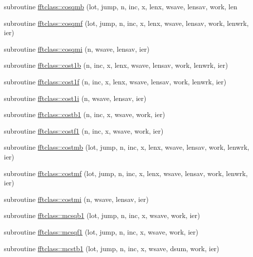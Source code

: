 \begin{DoxyCompactItemize}
subroutine \mbox{\hyperlink{namespacefftclass_a766146700483880896edee5e866f29a6}{fftclass\+::cosqmb}} (lot, jump, n, inc, x, lenx, wsave, lensav, work, len
\item 
subroutine \mbox{\hyperlink{namespacefftclass_a48467d0cccf9f7f93786f4997fe714f5}{fftclass\+::cosqmf}} (lot, jump, n, inc, x, lenx, wsave, lensav, work, lenwrk, ier)
\item 
subroutine \mbox{\hyperlink{namespacefftclass_a9851ac46e48072ac6c85e3c574a10dc5}{fftclass\+::cosqmi}} (n, wsave, lensav, ier)
\item 
subroutine \mbox{\hyperlink{namespacefftclass_a2bdaaab2b5d3130f8339f9463daa6db9}{fftclass\+::cost1b}} (n, inc, x, lenx, wsave, lensav, work, lenwrk, ier)
\item 
subroutine \mbox{\hyperlink{namespacefftclass_ae01eaac3c675ef6c95b60a480bda63ba}{fftclass\+::cost1f}} (n, inc, x, lenx, wsave, lensav, work, lenwrk, ier)
\item 
subroutine \mbox{\hyperlink{namespacefftclass_aa0605a45256c5ff2bfcd9229dd8854e4}{fftclass\+::cost1i}} (n, wsave, lensav, ier)
\item 
subroutine \mbox{\hyperlink{namespacefftclass_a2769de58926e8dc80c0fa9f862de7dce}{fftclass\+::costb1}} (n, inc, x, wsave, work, ier)
\item 
subroutine \mbox{\hyperlink{namespacefftclass_af419be9c656e387f89facc1033cf4f55}{fftclass\+::costf1}} (n, inc, x, wsave, work, ier)
\item 
subroutine \mbox{\hyperlink{namespacefftclass_a1bb83e3c96bf08b2789acf52feef22b8}{fftclass\+::costmb}} (lot, jump, n, inc, x, lenx, wsave, lensav, work, lenwrk, ier)
\item 
subroutine \mbox{\hyperlink{namespacefftclass_a04e4666f4382e42cf8e63ee5c44fc61a}{fftclass\+::costmf}} (lot, jump, n, inc, x, lenx, wsave, lensav, work, lenwrk, ier)
\item 
subroutine \mbox{\hyperlink{namespacefftclass_a4e2ea9d14ac7ed425be8cb1fd1ed8ddf}{fftclass\+::costmi}} (n, wsave, lensav, ier)
\item 
subroutine \mbox{\hyperlink{namespacefftclass_a91e23ffaebaadf2b1c22e689f69996a2}{fftclass\+::mcsqb1}} (lot, jump, n, inc, x, wsave, work, ier)
\item 
subroutine \mbox{\hyperlink{namespacefftclass_a05d00644e8642979b2c55b7822bbfb03}{fftclass\+::mcsqf1}} (lot, jump, n, inc, x, wsave, work, ier)
\item 
subroutine \mbox{\hyperlink{namespacefftclass_a10f96df2a58ce7f2e6ac9eaddf09588e}{fftclass\+::mcstb1}} (lot, jump, n, inc, x, wsave, dsum, work, ier)

\end{DoxyCompactItemize}
